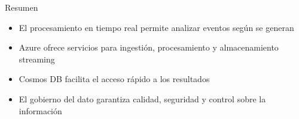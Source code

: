 \documentclass{beamer}
\begin{document}
\begin{frame}{Resumen}
\begin{itemize}
    \item El procesamiento en tiempo real permite analizar eventos según se generan
    \item Azure ofrece servicios para ingestión, procesamiento y almacenamiento streaming
    \item Cosmos DB facilita el acceso rápido a los resultados
    \item El gobierno del dato garantiza calidad, seguridad y control sobre la información
\end{itemize}
\end{frame}
\end{document}

